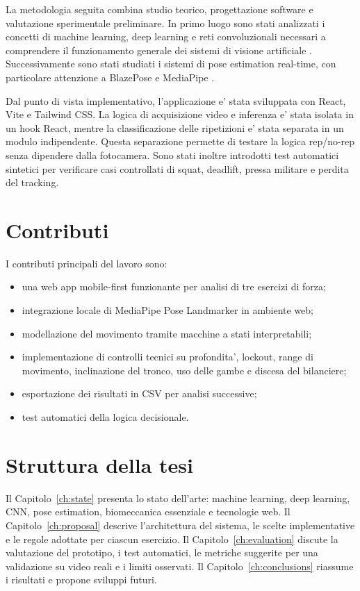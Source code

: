 La metodologia seguita combina studio teorico, progettazione software e valutazione sperimentale preliminare. In primo luogo sono stati analizzati i concetti di machine learning, deep learning e reti convoluzionali necessari a comprendere il funzionamento generale dei sistemi di visione artificiale \cite{geron2019hands,lecun2015deep,krizhevsky2012imagenet}. Successivamente sono stati studiati i sistemi di pose estimation real-time, con particolare attenzione a BlazePose e MediaPipe \cite{bazarevsky2020blazepose,grishchenko2022blazepose,lugaresi2019mediapipe}.

Dal punto di vista implementativo, l'applicazione e' stata sviluppata con React, Vite e Tailwind CSS. La logica di acquisizione video e inferenza e' stata isolata in un hook React, mentre la classificazione delle ripetizioni e' stata separata in un modulo indipendente. Questa separazione permette di testare la logica rep/no-rep senza dipendere dalla fotocamera. Sono stati inoltre introdotti test automatici sintetici per verificare casi controllati di squat, deadlift, pressa militare e perdita del tracking.

\section{Contributi}

I contributi principali del lavoro sono:

\begin{itemize}
  \item una web app mobile-first funzionante per analisi di tre esercizi di forza;
  \item integrazione locale di MediaPipe Pose Landmarker in ambiente web;
  \item modellazione del movimento tramite macchine a stati interpretabili;
  \item implementazione di controlli tecnici su profondita', lockout, range di movimento, inclinazione del tronco, uso delle gambe e discesa del bilanciere;
  \item esportazione dei risultati in CSV per analisi successive;
  \item test automatici della logica decisionale.
\end{itemize}

\section{Struttura della tesi}

Il Capitolo~\ref{ch:state} presenta lo stato dell'arte: machine learning, deep learning, CNN, pose estimation, biomeccanica essenziale e tecnologie web. Il Capitolo~\ref{ch:proposal} descrive l'architettura del sistema, le scelte implementative e le regole adottate per ciascun esercizio. Il Capitolo~\ref{ch:evaluation} discute la valutazione del prototipo, i test automatici, le metriche suggerite per una validazione su video reali e i limiti osservati. Il Capitolo~\ref{ch:conclusions} riassume i risultati e propone sviluppi futuri.
